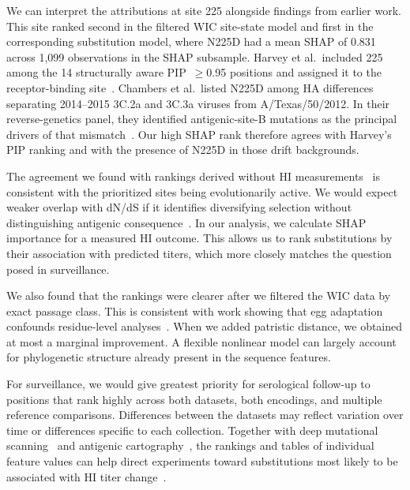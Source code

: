 \documentclass[12pt]{article}
\begin{document}
We can interpret the attributions at site 225 alongside findings from earlier work. This site ranked second in the filtered WIC site-state model and first in the corresponding substitution model, where N225D had a mean SHAP of 0.831 across 1{,}099 observations in the SHAP subsample. Harvey et al.\ included 225 among the 14 structurally aware PIP~$\geq$0.95 positions and assigned it to the receptor-binding site~\cite{Harvey2023PLoSComputBiol}. Chambers et al.\ listed N225D among HA differences separating 2014--2015 3C.2a and 3C.3a viruses from A/Texas/50/2012. In their reverse-genetics panel, they identified antigenic-site-B mutations as the principal drivers of that mismatch~\cite{Chambers2015CellReports}. Our high SHAP rank therefore agrees with Harvey's PIP ranking and with the presence of N225D in those drift backgrounds.

The agreement we found with rankings derived without HI measurements~\cite{Meyer2026Interface_sequenceML} is consistent with the prioritized sites being evolutionarily active. We would expect weaker overlap with dN/dS if it identifies diversifying selection without distinguishing antigenic consequence~\cite{fitch1991positive, suzuki2006natural, echave2016causes, Meyer2015PP_geom, Meyer2013MBE}. In our analysis, we calculate SHAP importance for a measured HI outcome. This allows us to rank substitutions by their association with predicted titers, which more closely matches the question posed in surveillance.

We also found that the rankings were clearer after we filtered the WIC data by exact passage class. This is consistent with work showing that egg adaptation confounds residue-level analyses~\cite{Bush2000PNAS_passage, McWhite2016VE_passage, Parker2016JGenVirol, Zost2017PNAS, kistler2025MBE}. When we added patristic distance, we obtained at most a marginal improvement. A flexible nonlinear model can largely account for phylogenetic structure already present in the sequence features.

For surveillance, we would give greatest priority for serological follow-up to positions that rank highly across both datasets, both encodings, and multiple reference comparisons. Differences between the datasets may reflect variation over time or differences specific to each collection. Together with deep mutational scanning~\cite{Lee2018PNAS, Thyagarajan2014eLife} and antigenic cartography~\cite{Smith2004Science}, the rankings and tables of individual feature values can help direct experiments toward substitutions most likely to be associated with HI titer change~\cite{Neher2016PNAS, Bedford2015Nature}.
\end{document}
